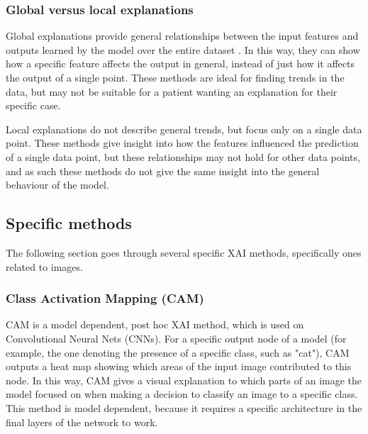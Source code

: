 \documentclass[conference,onecolumn]{IEEEtran}
\begin{document}
\subsubsection{Global versus local explanations}

Global explanations provide general relationships between the input features and outputs learned by the model over the entire dataset \cite{xaioverview}. In this way, they can show how a specific feature affects the output in general, instead of just how it affects the output of a single point. These methods are ideal for finding trends in the data, but may not be suitable for a patient wanting an explanation for their specific case.

Local explanations do not describe general trends, but focus only on a single data point. These methods give insight into how the features influenced the prediction of a single data point, but these relationships may not hold for other data points, and as such these methods do not give the same insight into the general behaviour of the model.

\subsection{Specific methods}

The following section goes through several specific XAI methods, specifically ones related to images.
\\


\subsubsection{Class Activation Mapping (CAM)}

CAM \cite{cam} is a model dependent, post hoc XAI method, which is used on Convolutional Neural Nets (CNNs). For a specific output node of a model (for example, the one denoting the presence of a specific class, such as "cat"), CAM outputs a heat map showing which areas of the input image contributed to this node. In this way, CAM gives a visual explanation to which parts of an image the model focused on when making a decision to classify an image to a specific class. This method is model dependent, because it requires a specific architecture in the final layers of the network to work.
\end{document}
